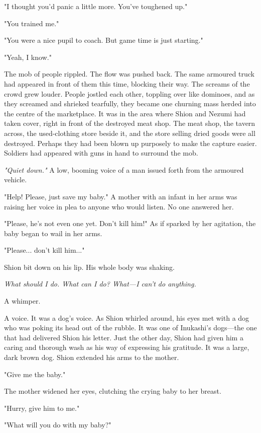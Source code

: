 "I thought you'd panic a little more. You've toughened up."

"You trained me."

"You were a nice pupil to coach. But game time is just starting."

"Yeah, I know."

The mob of people rippled. The flow was pushed back. The same armoured
truck had appeared in front of them this time, blocking their way. The
screams of the crowd grew louder. People jostled each other, toppling
over like dominoes, and as they screamed and shrieked tearfully, they
became one churning mass herded into the centre of the marketplace. It
was in the area where Shion and Nezumi had taken cover, right in front
of the destroyed meat shop. The meat shop, the tavern across, the
used-clothing store beside it, and the store selling dried goods were
all destroyed. Perhaps they had been blown up purposely to make the
capture easier. Soldiers had appeared with guns in hand to surround the
mob.

\emph{"Quiet down."} A low, booming voice of a man issued forth from the
armoured vehicle.

"Help! Please, just save my baby." A mother with an infant in her arms
was raising her voice in plea to anyone who would listen. No one
answered her.

"Please, he's not even one yet. Don't kill him!" As if sparked by her
agitation, the baby began to wail in her arms.

"Please... don't kill him..."

Shion bit down on his lip. His whole body was shaking.

\emph{What should I do. What can I do? What---I can't do anything.}

A whimper.

A voice. It was a dog's voice. As Shion whirled around, his eyes met
with a dog who was poking its head out of the rubble. It was one of
Inukashi's dogs---the one that had delivered Shion his letter. Just the
other day, Shion had given him a caring and thorough wash as his way of
expressing his gratitude. It was a large, dark brown dog. Shion extended
his arms to the mother.

"Give me the baby."

The mother widened her eyes, clutching the crying baby to her breast.

"Hurry, give him to me."

"What will you do with my baby?"

